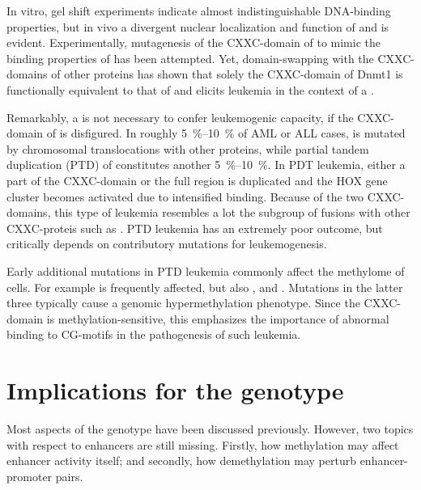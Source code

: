 In vitro, gel shift experiments indicate almost indistinguishable DNA-binding properties\cite{Bach2009}, but in vivo a divergent nuclear localization and function of  and   is evident\cite{Bach2009}. Experimentally, mutagenesis of the CXXC-domain of  to mimic the binding properties of  has been attempted\cite{Birch2013}. Yet, domain-swapping with the CXXC-domains of other proteins has shown that solely the CXXC-domain of Dnmt1 is functionally equivalent to that of   and elicits leukemia in the context of a \mllfp\cite{Risner2013}. 

Remarkably, a \mllfp is not necessary to confer leukemogenic capacity, if the CXXC-domain of  is disfigured. In roughly \SIrange{5}{10}{\percent} of AML or ALL cases,   is mutated by chromosomal translocations with other proteins, while partial tandem duplication (PTD) of  constitutes another \SIrange{5}{10}{\percent}\cite{Somervaille2010}.  In PDT leukemia, either a part of the CXXC-domain or the full region is duplicated and the HOX gene cluster becomes activated due to intensified binding\cite{Dorrance2006}. Because of the two CXXC-domains, this type of leukemia resembles a lot the subgroup of  fusions with other CXXC-proteis such as \cite{Ono2002}. PTD leukemia has an extremely poor outcome\cite{Choi2018}, but critically depends on contributory mutations for leukemogenesis\cite{Yip2017}.

Early additional mutations in PTD leukemia commonly affect the methylome of cells. For example  is frequently affected\cite{Kao2015}, but also ,  and \cite{Sun2017}. Mutations in the latter three typically cause a genomic hypermethylation phenotype. Since the CXXC-domain is methylation-sensitive, this emphasizes the importance of abnormal binding to CG-motifs in the pathogenesis of such leukemia. 

\section{Implications for the \dnmtchipheadline genotype}
\label{chap:d:enhancers:mechanism:dnmtchipgeno}

Most aspects of the \dnmtchip genotype have been discussed previously. However, two topics with respect to enhancers are still missing. Firstly, how methylation may affect enhancer activity itself; and secondly, how demethylation may perturb enhancer-promoter pairs. 

